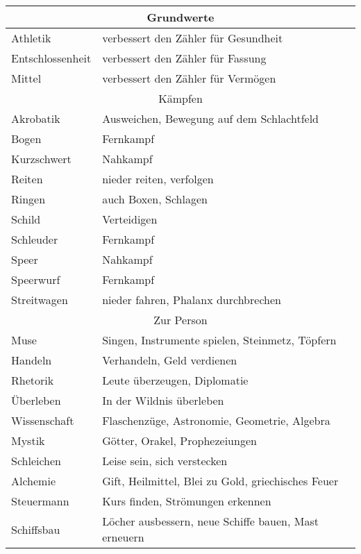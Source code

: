 \documentclass{tufte-handout}
\begin{document}
\begin{fullwidth}
\begin{tabular}{ll}
\multicolumn{2}{c}{Grundwerte}                                          \\
\midrule
Athletik         & verbessert den Zähler für Gesundheit                 \\
Entschlossenheit & verbessert den Zähler für Fassung                    \\
Mittel           & verbessert den Zähler für Vermögen                   \\
\multicolumn{2}{c}{Kämpfen}                                             \\
\midrule
Akrobatik        & Ausweichen, Bewegung auf dem Schlachtfeld            \\
Bogen            & Fernkampf                                            \\
Kurzschwert      & Nahkampf                                             \\
Reiten           & nieder reiten, verfolgen                             \\
Ringen           & auch Boxen, Schlagen                                 \\
Schild           & Verteidigen                                          \\
Schleuder        & Fernkampf                                            \\
Speer            & Nahkampf                                             \\
Speerwurf        & Fernkampf                                            \\
Streitwagen      & nieder fahren, Phalanx durchbrechen                  \\
\multicolumn{2}{c}{Zur Person}                                          \\
\midrule
Muse             & Singen, Instrumente spielen, Steinmetz, Töpfern      \\
Handeln          & Verhandeln, Geld verdienen                           \\
Rhetorik         & Leute überzeugen, Diplomatie                         \\
Überleben        & In der Wildnis überleben                             \\
Wissenschaft     & Flaschenzüge, Astronomie, Geometrie, Algebra         \\
Mystik           & Götter, Orakel, Prophezeiungen                       \\
Schleichen       & Leise sein, sich verstecken                          \\
Alchemie         & Gift, Heilmittel, Blei zu Gold, griechisches Feuer   \\
Steuermann       & Kurs finden, Strömungen erkennen                     \\
Schiffsbau       & Löcher ausbessern, neue Schiffe bauen, Mast erneuern \\
\end{tabular}
\end{fullwidth}
\end{document}
